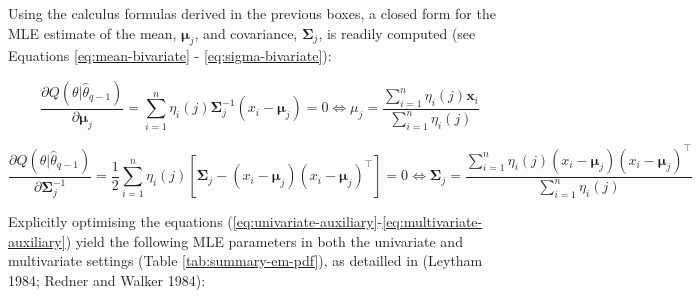 Using the calculus formulas derived in the previous boxes, a closed form for the MLE estimate of the mean, \(\boldsymbol{\mu}_j\), and covariance, \(\boldsymbol{\Sigma}_j\), is readily computed (see Equations \eqref{eq:mean-bivariate} - \eqref{eq:sigma-bivariate}):

\begin{equation}
\frac{\partial Q(\theta|\hat{\theta}_{q-1})}{\partial \boldsymbol{\mu}_j} =
\sum_{i=1}^n \eta_i(j) \boldsymbol{\Sigma}_j^{-1}(x_i - \boldsymbol{\mu}_j) =0
\Leftrightarrow
  \mu_j = \frac{\sum_{i=1}^n \eta_i(j) \boldsymbol{x}_i}{\sum_{i=1}^n \eta_i(j)}
\label{eq:mean-bivariate}
\end{equation}

\begin{equation}
 \frac{\partial Q(\theta|\hat{\theta}_{q-1})}{\partial \boldsymbol{\Sigma}_j^{-1}}=\frac{1}{2} \sum_{i=1}^n \eta_i(j) \left[ \boldsymbol{\Sigma}_j  - (x_i - \boldsymbol{\mu}_j)(x_i - \boldsymbol{\mu}_j)^\top \right]= 0
\Leftrightarrow
  \boldsymbol{\Sigma}_j = \frac{\sum_{i=1}^n \eta_i(j) (x_i - \boldsymbol{\mu}_j)(x_i - \boldsymbol{\mu}_j)^\top }{\sum_{i=1}^n \eta_i(j)}
\label{eq:sigma-bivariate}
\end{equation}

Explicitly optimising the equations (\eqref{eq:univariate-auxiliary}-\eqref{eq:multivariate-auxiliary}) yield the following MLE parameters in both the univariate and multivariate settings (Table \ref{tab:summary-em-pdf}), as detailled in (Leytham 1984; Redner and Walker 1984):

